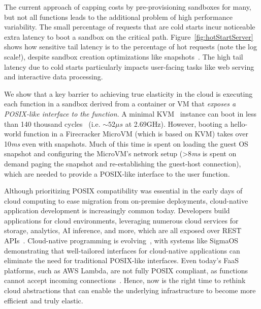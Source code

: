 The current approach of capping costs by pre-provisioning sandboxes for many, but not all functions leads to the additional problem of high performance variability. The small percentage of requests that are cold starts incur noticeable extra latency to boot a sandbox on the critical path. Figure~\ref{fig:hotStartServer} shows how sensitive tail latency is to the percentage of hot requests (note the log scale!), despite sandbox creation optimizations like snapshots~\cite{firecracker:snapshot_restoration}. The high tail latency due to cold starts particularly impacts user-facing tasks like web serving and interactive data processing. 

We show that a key barrier to achieving true elasticity in the cloud is executing each function in a sandbox derived from a container or VM that \textit{exposes a POSIX-like interface to the function}. 
A minimal KVM~\cite{kvm} instance can boot in less than 140 thousand cycles~\cite{virtines} (i.e. $\sim52\mu s$ at 2.69GHz). However, booting a hello-world function in a Firecracker MicroVM (which is based on KVM) takes over 10\textit{ms} even with snapshots.
Much of this time is spent on loading the guest OS snapshot and configuring the MicroVM's network setup (>8\textit{ms} is spent on demand paging the snapshot and re-establishing the guest-host connection), which are needed to provide a POSIX-like interface to the user function. 

Although prioritizing POSIX compatibility was essential in the early days of cloud computing to ease migration from on-premise deployments, cloud-native application development is increasingly common today. Developers build applications for cloud environments, leveraging numerous cloud services for storage, analytics, AI inference, and more, which are all exposed over REST APIs~\cite{aws-rest-api}. Cloud-native programming is evolving~\cite{serverless-end-linux, new-directions-cloud, rethinking-serverless, compute-centric-networking, func_as_func, mosaic, pulumi, yu2023following, cloudburst, boxer-elasticity, serverless-uphill, lambdata, dataflower}, with systems like SigmaOS~\cite{sigmaos} demonstrating that well-tailored interfaces for cloud-native applications can eliminate the need for traditional POSIX-like interfaces. Even today's FaaS platforms, such as AWS Lambda, are not fully POSIX compliant, as functions cannot accept incoming connections~\cite{wawrzoniak2021boxer}. 
Hence, now is the right time to rethink cloud abstractions that can enable the underlying infrastructure to become more efficient and truly elastic. 

